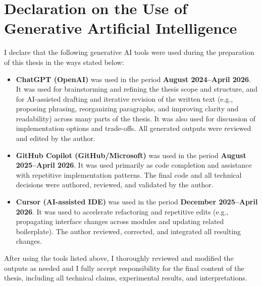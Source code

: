 \chapter*{Declaration on the Use of Generative Artificial Intelligence}

I declare that the following generative AI tools were used during the preparation of this thesis in the ways stated below:

\begin{itemize}
  \item \textbf{ChatGPT (OpenAI)} was used in the period \textbf{August 2024--April 2026}.
  It was used for brainstorming and refining the thesis scope and structure, and for AI-assisted drafting and iterative revision of the written text (e.g., proposing phrasing, reorganizing paragraphs, and improving clarity and readability) across many parts of the thesis. It was also used for discussion of implementation options and trade-offs. All generated outputs were reviewed and edited by the author.

  \item \textbf{GitHub Copilot (GitHub/Microsoft)} was used in the period \textbf{August 2025--April 2026}.
  It was used primarily as code completion and assistance with repetitive implementation patterns. The final code and all technical decisions were authored, reviewed, and validated by the author.

  \item \textbf{Cursor (AI-assisted IDE)} was used in the period \textbf{December 2025--April 2026}.
  It was used to accelerate refactoring and repetitive edits (e.g., propagating interface changes across modules and updating related boilerplate). The author reviewed, corrected, and integrated all resulting changes.
\end{itemize}

After using the tools listed above, I thoroughly reviewed and modified the outputs as needed and I fully accept responsibility for the final content of the thesis, including all technical claims, experimental results, and interpretations.
